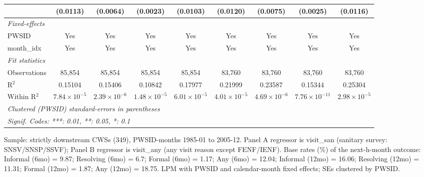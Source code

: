 \begin{table}[htbp]
\begin{adjustbox}{width = \textwidth, center}
\begin{tabular}{lcccccccc}
                                         & (0.0113)               & (0.0064)                & (0.0023)              & (0.0103)              & (0.0120)                & (0.0075)                 & (0.0025)               & (0.0116)\\   
   \midrule
   \emph{Fixed-effects}\\
   PWSID                                 & Yes                    & Yes                     & Yes                   & Yes                   & Yes                     & Yes                      & Yes                    & Yes\\  
   month\_idx                            & Yes                    & Yes                     & Yes                   & Yes                   & Yes                     & Yes                      & Yes                    & Yes\\  
   \midrule
   \emph{Fit statistics}\\
   Observations                          & 85,854                 & 85,854                  & 85,854                & 85,854                & 83,760                  & 83,760                   & 83,760                 & 83,760\\  
   R$^2$                                 & 0.15104                & 0.15406                 & 0.10842               & 0.17977               & 0.21999                 & 0.23587                  & 0.15344                & 0.25304\\  
   Within R$^2$                          & $7.84\times 10^{-5}$   & $2.39\times 10^{-6}$    & $1.48\times 10^{-5}$  & $6.01\times 10^{-5}$  & $4.01\times 10^{-5}$    & $4.69\times 10^{-6}$     & $7.76\times 10^{-11}$  & $2.98\times 10^{-5}$\\   
   \midrule \midrule
   \multicolumn{9}{l}{\emph{Clustered (PWSID) standard-errors in parentheses}}\\
   \multicolumn{9}{l}{\emph{Signif. Codes: ***: 0.01, **: 0.05, *: 0.1}}\\
\end{tabular}
\par\endgroup
\end{adjustbox}
{\tiny\linespread{1}\selectfont \par \raggedright 
Sample: strictly downstream CWSs (349), PWSID-months 1985-01 to 2005-12. Panel A regressor is visit\_san (sanitary survey: SNSV/SNSP/SSVF); Panel B regressor is visit\_any (any visit reason except FENF/IENF). Base rates (\%) of the next-h-month outcome: Informal (6mo) = 9.87; Resolving (6mo) = 6.7; Formal (6mo) = 1.17; Any (6mo) = 12.04; Informal (12mo) = 16.06; Resolving (12mo) = 11.31; Formal (12mo) = 1.87; Any (12mo) = 18.75. LPM with PWSID and calendar-month fixed effects; SEs clustered by PWSID.
}
\end{table}
